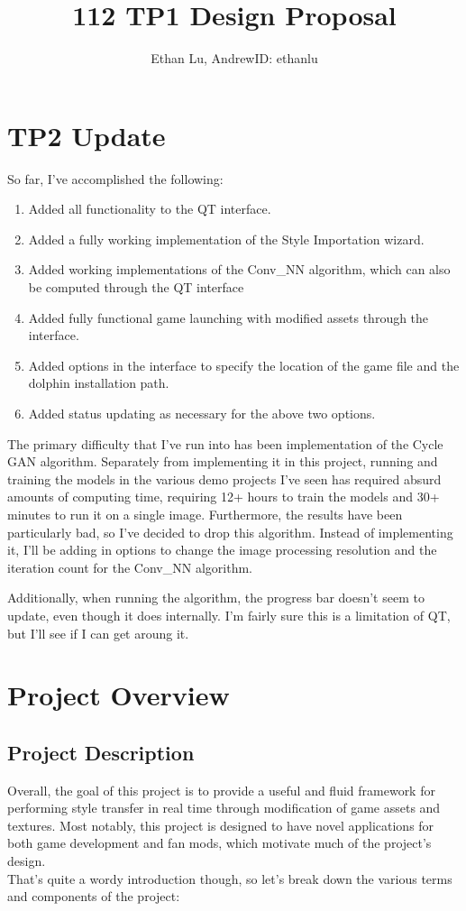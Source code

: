 \documentclass[12pt]{article}
\begin{document}
\title{112 TP1 Design Proposal}
\author{Ethan Lu, AndrewID: ethanlu}
\maketitle
\section{TP2 Update}
So far, I've accomplished the following:
\begin{enumerate}
	\item Added all functionality to the QT interface.
	\item Added a fully working implementation of the Style Importation wizard. 
	\item Added working implementations of the Conv\_NN algorithm, which can also be computed through the QT interface
	\item Added fully functional game launching with modified assets through the interface.
	\item Added options in the interface to specify the location of the game file and the dolphin installation path.
	\item Added status updating as necessary for the above two options.
\end{enumerate}
The primary difficulty that I've run into has been implementation of the Cycle GAN algorithm. 
Separately from implementing it in this project, running and training the models in the various demo projects I've seen has required absurd amounts of computing time, requiring 12+ hours to train the models and 30+ minutes to run it on a single image. Furthermore, the results have been particularly bad, so I've decided to drop this algorithm.
Instead of implementing it, I'll be adding in options to change the image processing resolution and the iteration count for the Conv\_NN algorithm.

Additionally, when running the algorithm, the progress bar doesn't seem to update, even though it does internally. I'm fairly sure this is a limitation of QT, but I'll see if I can get aroung it.
\section{Project Overview}

\subsection{Project Description}
    Overall, the goal of this project is to provide a useful and fluid framework for performing style transfer in real time through modification of game assets and textures. 
    Most notably, this project is designed to have novel applications for both game development and fan mods, which motivate much of the project's design. \\
    That's quite a wordy introduction though, so let's break down the various terms and components of the project:
\end{document}
